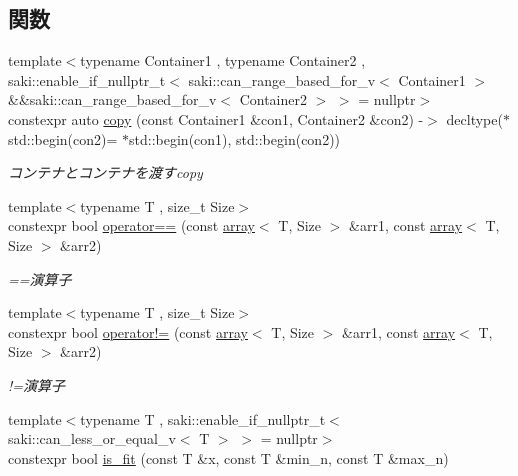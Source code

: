 \subsection*{関数}
\begin{DoxyCompactItemize}
\item 
{\footnotesize template$<$typename Container1 , typename Container2 , saki\+::enable\+\_\+if\+\_\+nullptr\+\_\+t$<$ saki\+::can\+\_\+range\+\_\+based\+\_\+for\+\_\+v$<$ Container1 $>$ \&\&saki\+::can\+\_\+range\+\_\+based\+\_\+for\+\_\+v$<$ Container2 $>$ $>$  = nullptr$>$ }\\constexpr auto \mbox{\hyperlink{namespacesaki_abd8c75003f2a213607842f5d82eac806}{copy}} (const Container1 \&con1, Container2 \&con2) -\/$>$ decltype($\ast$std\+::begin(con2)= $\ast$std\+::begin(con1), std\+::begin(con2))
\begin{DoxyCompactList}\small\item\em コンテナとコンテナを渡すcopy \end{DoxyCompactList}\item 
{\footnotesize template$<$typename T , size\+\_\+t Size$>$ }\\constexpr bool \mbox{\hyperlink{namespacesaki_a5ce8a66ed6ece15fa9ddeaec2746374d}{operator==}} (const \mbox{\hyperlink{classsaki_1_1array}{array}}$<$ T, Size $>$ \&arr1, const \mbox{\hyperlink{classsaki_1_1array}{array}}$<$ T, Size $>$ \&arr2)
\begin{DoxyCompactList}\small\item\em ==演算子 \end{DoxyCompactList}\item 
{\footnotesize template$<$typename T , size\+\_\+t Size$>$ }\\constexpr bool \mbox{\hyperlink{namespacesaki_aed742cc915a830fea9f4993c0a031c45}{operator!=}} (const \mbox{\hyperlink{classsaki_1_1array}{array}}$<$ T, Size $>$ \&arr1, const \mbox{\hyperlink{classsaki_1_1array}{array}}$<$ T, Size $>$ \&arr2)
\begin{DoxyCompactList}\small\item\em !=演算子 \end{DoxyCompactList}\item 
{\footnotesize template$<$typename T , saki\+::enable\+\_\+if\+\_\+nullptr\+\_\+t$<$ saki\+::can\+\_\+less\+\_\+or\+\_\+equal\+\_\+v$<$ T $>$ $>$  = nullptr$>$ }\\constexpr bool \mbox{\hyperlink{namespacesaki_a45597d7382905409bada2316f78502fc}{is\+\_\+fit}} (const T \&x, const T \&min\+\_\+n, const T \&max\+\_\+n)

\end{DoxyCompactItemize}

